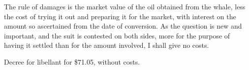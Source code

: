 The rule of damages is the market value of the oil obtained from the whale, less
the cost of trying it out and preparing it for the market, with interest on the
amount so ascertained from the date of conversion. As the question is new and
important, and the suit is contested on both sides, more for the purpose of
having it settled than for the amount involved, I shall give no costs.

Decree for libellant for \$71.05, without costs.

